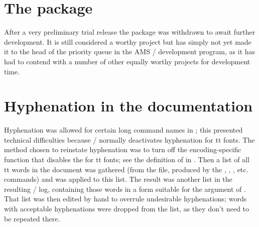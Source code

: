 \documentclass{amsdtx}
\begin{document}
\section{The  package}

After a very preliminary trial release the  package was
withdrawn to await further development. It is still considered a worthy
project but has simply not yet made it to the head of the priority queue
in the AMS \latex/ development program, as it has had to contend with a
number of other equally worthy projects for development time.

\section{Hyphenation in the documentation}

Hyphenation was allowed for certain long command names in
; this presented technical difficulties because \latex/
normally deactivates hyphenation for tt fonts. The method chosen to
reinstate hyphenation was to turn off the encoding-specific function
 that disables the  for tt fonts; see the
definition of  in . Then a list of all
tt words in the document was gathered (from the  file, produced
by the , , , etc. commands) and 
was applied to this list. The result was another list in the resulting
\tex/ log, containing those words in a form suitable for the argument of
. That list was then edited by hand to overrule
undesirable hyphenations; words with acceptable hyphenations were
dropped from the list, as they don't need to be repeated there.
\end{document}
